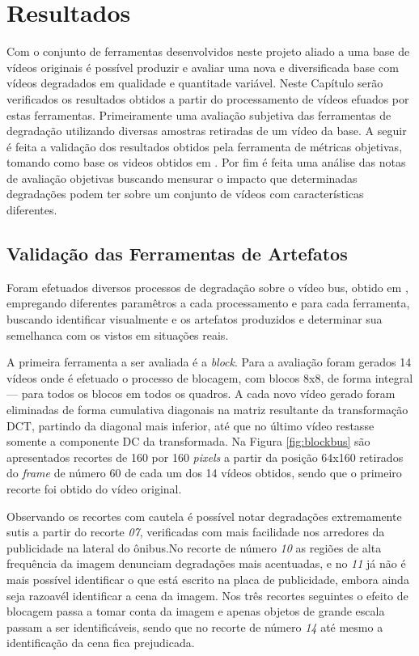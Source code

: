 
\chapter{Resultados} %

Com o conjunto de ferramentas desenvolvidos neste projeto aliado a uma base de vídeos originais é possível produzir e avaliar uma nova e diversificada base com vídeos degradados em qualidade e quantitade variável.
Neste Capítulo serão verificados os resultados obtidos a partir do processamento de vídeos efuados por estas ferramentas. Primeiramente uma avaliação subjetiva das ferramentas de degradação utilizando diversas amostras retiradas de um vídeo da base. A seguir é feita a validação dos resultados obtidos pela ferramenta de métricas objetivas, tomando como base os videos obtidos em \cite{videolab}.
Por fim é feita uma análise das notas de avaliação objetivas buscando mensurar o impacto que determinadas degradações podem ter sobre um conjunto de vídeos com características diferentes.

\section{Validação das Ferramentas de Artefatos}

Foram efetuados diversos processos de degradação sobre o vídeo bus, obtido em \cite{tracevideoseq},  empregando diferentes paramêtros a cada processamento e para cada ferramenta, buscando identificar visualmente e os artefatos produzidos e determinar sua semelhanca com os vistos em situações reais.

A primeira ferramenta a ser avaliada é a \emph{block}.
Para a avaliação foram gerados 14 vídeos onde é efetuado o processo de blocagem, com blocos 8x8, de forma integral --- para todos os blocos em todos os quadros. A cada novo vídeo gerado foram eliminadas de forma cumulativa diagonais na matriz resultante da transformação DCT, partindo da diagonal mais inferior, até que no último vídeo restasse somente a componente DC da transformada. 
Na Figura \ref{fig:blockbus} são apresentados recortes de 160 por 160 \emph{pixels} a partir da posição 64x160 retirados do \emph{frame} de número 60 de cada um dos 14 vídeos obtidos, sendo que o primeiro recorte foi obtido do vídeo original.

Observando os recortes com cautela é possível notar degradações extremamente sutis a partir do recorte \emph{07}, verificadas com mais facilidade nos arredores da publicidade na lateral do ônibus.No recorte de número \emph{10} as regiões de alta frequência da imagem denunciam degradações mais acentuadas, e no \emph{11} já não é mais possível identificar o que está escrito na placa de publicidade, embora ainda seja razoavél identificar a cena da imagem.
Nos três recortes seguintes o efeito de blocagem passa a tomar conta da imagem e apenas objetos de grande escala passam a ser identificáveis, sendo que no recorte de número \emph{14} até mesmo a identificação da cena fica prejudicada.

